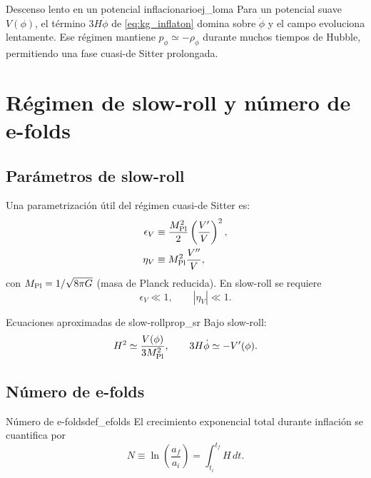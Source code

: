 \begin{ejemplo}{Descenso lento en un potencial inflacionario}{ej_loma}
Para un potencial suave $V(\phi)$, el término $3H\dot\phi$ de \eqref{eq:kg_inflaton} domina sobre $\ddot\phi$ y el campo evoluciona lentamente. Ese régimen mantiene $p_\phi\simeq-\rho_\phi$ durante muchos tiempos de Hubble, permitiendo una fase cuasi-de Sitter prolongada.
\end{ejemplo}

\section{Régimen de slow-roll y número de e-folds}
\label{sec:slow_roll}

\subsection{Parámetros de slow-roll}

Una parametrización útil del régimen cuasi-de Sitter es:
\begin{align}
  \epsilon_V &\equiv \frac{M_{\rm Pl}^2}{2}\left(\frac{V'}{V}\right)^2,\\
  \eta_V &\equiv M_{\rm Pl}^2\frac{V''}{V},
\end{align}
con $M_{\rm Pl}=1/\sqrt{8\pi G}$ (masa de Planck reducida). En slow-roll se requiere
\begin{equation}
  \epsilon_V \ll 1,\qquad |\eta_V|\ll1.
\end{equation}

\begin{proposicion}{Ecuaciones aproximadas de slow-roll}{prop_sr}
Bajo slow-roll:
\begin{equation}
  H^2 \simeq \frac{V(\phi)}{3M_{\rm Pl}^2},
  \qquad
  3H\dot\phi \simeq -V'(\phi).
\end{equation}
\end{proposicion}

\subsection{Número de e-folds}

\begin{definicion}{Número de e-folds}{def_efolds}
El crecimiento exponencial total durante inflación se cuantifica por
\begin{equation}
  N \equiv \ln\!\left(\frac{a_f}{a_i}\right)=\int_{t_i}^{t_f}H\,dt.
\end{equation}
\end{definicion}

